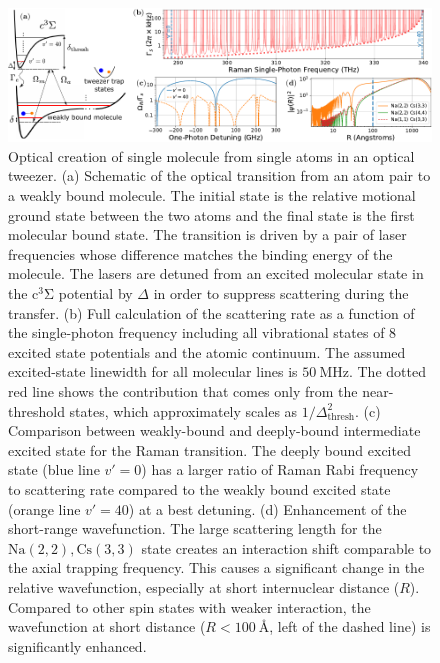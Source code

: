 \documentclass[aps,prl,twocolumn,10pt,superscriptaddress]{revtex4-1}
\newcommand{\Na}{\mathrm{Na}}
\newcommand{\Cs}{\mathrm{Cs}}
\begin{document}
\begin{figure}
  \includegraphics[width=\textwidth]{imgs/fig-theory.pdf}
  \caption{Optical creation of single molecule from single atoms in an optical tweezer.
    (a) Schematic of the optical transition from an atom pair to a weakly bound molecule.
    The initial state is the relative motional ground state between the two atoms
    and the final state is the first molecular bound state.
    The transition is driven by a pair of laser frequencies whose difference matches the binding energy
    of the molecule.
    The lasers are detuned from an excited molecular state in the $\mathrm{c^3\Sigma}$ potential
    by $\Delta$ in order to suppress scattering during the transfer.
    (b) Full calculation of the scattering rate as a function of the single-photon frequency
    including all vibrational states of 8 excited state potentials
    and the atomic continuum.
    The assumed excited-state linewidth for all molecular lines is $50~\text{MHz}$.
    The dotted red line shows the contribution that comes only from the near-threshold states, which approximately scales as $1/\Delta_{\mathrm{thresh}}^2$.
    (c) Comparison between weakly-bound and deeply-bound intermediate excited state
    for the Raman transition.
    The deeply bound excited state (blue line $v'=0$)
    has a larger ratio of Raman Rabi frequency to scattering rate
    compared to the weakly bound excited state (orange line $v'=40$) at a best detuning.
    (d) Enhancement of the short-range wavefunction.
    The large scattering length for the $\Na(2,2),\Cs(3,3)$ state creates an interaction shift
    comparable to the axial trapping frequency.
    This causes a significant change in the relative wavefunction, especially at short
    internuclear distance ($R$).
    Compared to other spin states with weaker interaction,
    the wavefunction at short distance ($R<100\ \text{\AA}$, left of the dashed line)
    is significantly enhanced.
    \label{f-theory}
  }
\end{figure}
\end{document}
